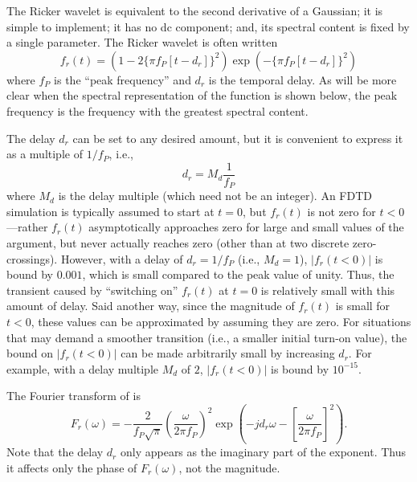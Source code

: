 The Ricker wavelet is equivalent to the second derivative of a
Gaussian; it is simple to implement; it has no dc component; and, its
spectral content is fixed by a single parameter.  The Ricker wavelet
is often written
\begin{equation}
f_r(t) = \left(1-2 \bigl\{\pi f_P \left[t-d_r\right]\bigr\}^2\right)
         \exp\!\left(-\bigl\{\pi f_P \left[t-d_r\right]\bigr\}^2\right)
\label{eq:rickerTime}
\end{equation}
where $f_P$ is the ``peak frequency'' and $d_r$ is the temporal delay.
As will be more clear when the spectral representation of the function
is shown below, the peak frequency is the frequency with the greatest
spectral content.

The delay $d_r$ can be set to any desired amount, but it is convenient
to express it as a multiple of $1/f_P$, i.e.,
\begin{equation}
  d_r = M_d \frac{1}{f_P}
\end{equation}
where $M_d$ is the delay multiple (which need not be an integer).  An
FDTD simulation is typically assumed to start at $t=0$, but $f_r(t)$
is not zero for $t<0$---rather $f_r(t)$ asymptotically approaches zero
for large and small values of the argument, but never actually reaches
zero (other than at two discrete zero-crossings).  However, with a
delay of $d_r=1/f_P$ (i.e., $M_d=1$), $|f_r(t<0)|$ is bound by
$0.001$, which is small compared to the peak value of unity.  Thus,
the transient caused by ``switching on'' $f_r(t)$ at $t=0$ is
relatively small with this amount of delay.  Said another way, since
the magnitude of $f_r(t)$ is small for $t<0$, these values can be
approximated by assuming they are zero.  For situations that may
demand a smoother transition (i.e., a smaller initial turn-on value),
the bound on $|f_r(t<0)|$ can be made arbitrarily small by increasing
$d_r$.  For example, with a delay multiple $M_d$ of $2$, $|f_r(t<0)|$
is bound by $10^{-15}$.

The Fourier transform of  is
\begin{equation}
  F_r(\omega) = -\frac{2}{f_P\sqrt{\pi}}
           \left(\frac{\omega}{2\pi f_P}\right)^2
           \exp\!\left(-jd_r\omega
	             -\left[\frac{\omega}{2\pi f_P}\right]^2\right).
  \label{eq:rickerOmega}
\end{equation}
Note that the delay $d_r$ only appears as the imaginary part of the
exponent.  Thus it affects only the phase of $F_r(\omega)$, not the
magnitude.

